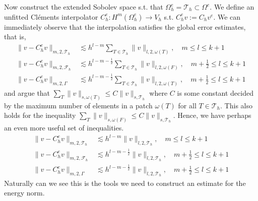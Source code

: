 Now construct the extended Sobolev space s.t. that $\Omega _{h}^{e} =\mathcal{T}_{h} \subset  \Omega^{e} $. We define an unfitted Cléments interpolator $C_{h}^{e}: H^{m}( \Omega ^{e}_{h}) \to V_{h}$
s.t.  $C ^{e} _{h} v := C _{h} v^{e} $.
We can immediately observe that the interpolation satisfies the global error estimates, that is,
\begin{align*}
    \| v - C _{h}^{e} v \|_{  m,2, \mathcal{T} _{h} }^{  } & \lesssim h^{l-m}\sum_{T \in \mathcal{T}_h} \| v \|_{ l,2, \omega(T) }^{  }, \quad m\le l\le k+1 \\
    \| v - C ^{e}_{h}v \|_{ m,2,\mathcal{F} _{h} }^{  } & \lesssim h^{l-m-\frac{1}{2}}\sum_{T \in \mathcal{T}_h} \| v \|_{ l,2, \omega(F)  }^{  }, \quad m+\frac{1}{2}  \le  l \le   k+1 \\
\| v - C ^{e}_{h}v \|_{ m,2, \Gamma }^{  } & \lesssim h^{l-m-\frac{1}{2}} \sum_{T \in \mathcal{T}_h}  \| v \|_{ l,2,  \omega(T)  }^{  }, \quad m+\frac{1}{2}  \le  l \le  k+1
\end{align*}
 and argue that $ \sum_{T}^{} \| v \|_{s,\omega ( T)   }^{  } \le C  \| v \|_{s, \mathcal{T}_{h}   }^{  } $ where $C$ is some constant decided by the maximum number of elements in a patch
    $\omega( T)  $ for all $T \in \mathcal{T} _{h}$. This also holds for the inequality $ \sum_{T}^{} \| v \|_{s,\omega ( F)   }^{  } \le C  \| v \|_{s, \mathcal{T}_{h}   }^{  } $. Hence, we have perhaps an even more useful set of inequalities.
\begin{align}
    \label{eq:bi_projection_estimates_1}
    \| v - C _{h}^{e} v \|_{  m,2, \mathcal{T} _{h} }^{  } & \lesssim h^{l-m} \| v \|_{ l,2, \mathcal{T} _{h} }^{  }, \quad m\le l\le k+1 \\
    \label{eq:bi_projection_estimates_2}
    \| v - C ^{e}_{h}v \|_{ m,2,\mathcal{F} _{h} }^{  } & \lesssim h^{l-m-\frac{1}{2}} \| v \|_{ l,2, \mathcal{T} _{h}  }^{  }, \quad m+\frac{1}{2}  \le  l \le   k+1 \\
    \label{eq:bi_projection_estimates_3}
\| v - C ^{e}_{h}v \|_{ m,2, \Gamma }^{  } & \lesssim h^{l-m-\frac{1}{2}}   \| v \|_{ l,2,  \mathcal{T} _{h}  }^{  }, \quad m+\frac{1}{2}  \le  l \le  k+1
\end{align}
Naturally can we see this is the tools we need to construct an estimate for the energy norm.

